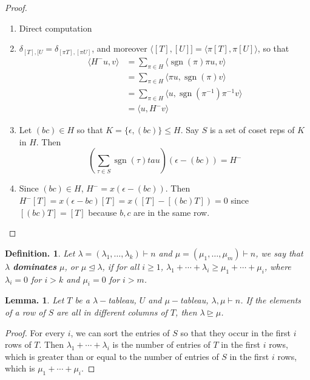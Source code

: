 \documentclass[11pt, a4paper]{memoir}
\theoremstyle{change}
\newtheorem{lemma}[theorem]{Lemma.}
\theoremstyle{plain}
\theoremstyle{nonumberplain}
\newtheorem{definition}{Definition.}
\newtheorem{proof}{Proof}
\DeclareMathOperator{\sgn}{sgn}
\numberwithin{equation}{section}
\begin{document}
\begin{proof}
    \begin{enumerate}[nl]
        \item Direct computation
        \item $\delta_{[T],[U}=\delta_{[\pi T],[\pi U]}$, and moreover $\langle [T],[U]]=\langle \pi[T],\pi[U]\rangle$, so that
            \begin{align*}
                \langle H^-u,v\rangle &= \sum_{\pi\in H}\langle\sgn(\pi)\pi u,v\rangle\\
                                      &= \sum_{\pi\in H}\langle\pi u,\sgn(\pi)v\rangle\\
                                      &= \sum_{\pi\in H}\langle u,\sgn(\pi^{-1})\pi^{-1}v\rangle\\
                                      &= \langle u,H^-v\rangle
            \end{align*}
        \item Let $(bc)\in H$ so that $K=\{\epsilon,(bc)\}\leq H$.
            Say $S$ is a set of coset reps of $K$ in $H$.
            Then
            \begin{equation*}
                \left(\sum_{\tau\in S}\sgn(\tau)tau\right)(\epsilon-(bc))=H^-
            \end{equation*}
        \item Since $(bc)\in H$, $H^-=x(\epsilon-(bc))$.
            Then $H^-[T]=x(\epsilon-bc)[T]=x([T]-[(bc)T])=0$ since $[(bc)T]=[T]$ because $b,c$ are in the same row.
    \end{enumerate}
\end{proof}
\begin{definition}
    Let $\lambda=(\lambda_1,\ldots,\lambda_k)\vdash n$ and $\mu=(\mu_1,\ldots,\mu_m)\vdash n$, we say that $\lambda$ \textbf{dominates} $\mu$, or $\mu\trianglelefteq\lambda$, if for all $i\geq 1$, $\lambda_1+\cdots+\lambda_i\geq\mu_1+\cdots+\mu_i$, where $\lambda_i=0$ for $i>k$ and $\mu_i=0$ for $i>m$.
\end{definition}
\begin{lemma}
    Let $T$ be a $\lambda-$tableau, $U$ and $\mu-$tableau, $\lambda,\mu\vdash n$.
    If the elements of a row of $S$ are all in different columns of $T$, then $\lambda\trianglerighteq\mu$.
\end{lemma}
\begin{proof}
    For every $i$, we can sort the entries of $S$ so that they occur in the first $i$ rows of $T$.
    Then $\lambda_1+\cdots+\lambda_i$ is the number of entries of $T$ in the first $i$ rows, which is greater than or equal to the number of entries of $S$ in the first $i$ rows, which is $\mu_1+\cdots+\mu_i$.
\end{proof}
\end{document}
